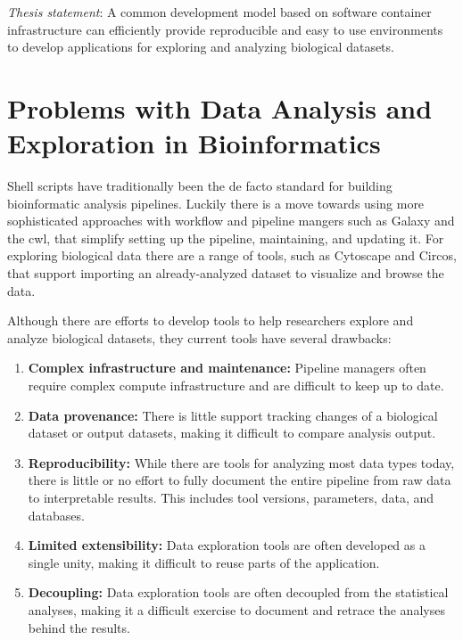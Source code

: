 \emph{Thesis statement}:
A common development model based on software container infrastructure can
efficiently provide reproducible and easy to use environments to develop
applications for exploring and analyzing biological datasets. 

\section{Problems with Data Analysis and Exploration in Bioinformatics} 
Shell scripts have traditionally been the de facto standard for building
bioinformatic analysis pipelines. Luckily there is a move towards using more
sophisticated approaches with workflow and pipeline mangers such as
Galaxy\cite{galaxy} and the \gls{cwl}\cite{cwl}, that simplify setting up the
pipeline, maintaining, and updating it. For exploring biological data there are
a range of tools, such as Cytoscape\cite{cytoscape} and Circos\cite{circos},
that support importing an already-analyzed dataset to visualize and browse the
data. 

Although there are efforts to develop tools to help researchers explore and
analyze biological datasets, they current tools have several drawbacks:

\begin{enumerate}
    \item \textbf{Complex infrastructure and maintenance:} Pipeline managers
        often require complex compute infrastructure and are difficult to keep
        up to date. 
    \item \textbf{Data provenance:}  There is little support tracking changes
        of a biological dataset or output datasets, making it difficult to
        compare analysis output. 
    \item \textbf{Reproducibility:} While there are tools for analyzing most
        data types today, there is little or no effort to fully document the
        entire pipeline from raw data to interpretable results. This includes
        tool versions, parameters, data, and databases. 
    \item \textbf{Limited extensibility:} Data exploration tools are often
        developed as a single unity, making it difficult to reuse parts of the
        application.
    \item \textbf{Decoupling:} Data exploration tools are often decoupled from
        the statistical analyses, making it a difficult exercise to document and
        retrace the analyses behind the results. 
\end{enumerate} 

